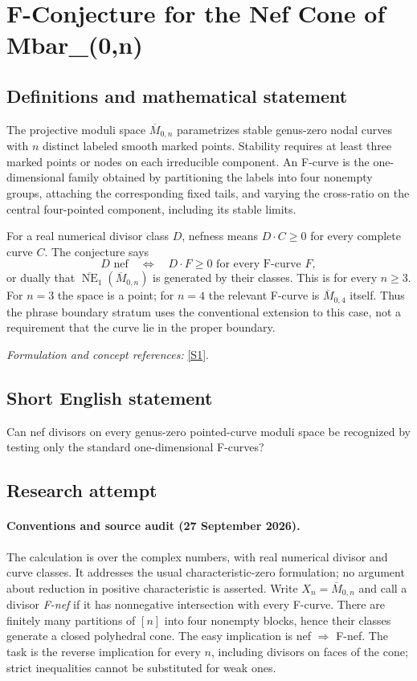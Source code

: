 \documentclass[11pt]{article}
\begin{document}
\section*{\texorpdfstring{F-Conjecture for the Nef Cone of Mbar\_(0,n)}{F-Conjecture for the Nef Cone of Mbar\_(0,n)}}\label{30006972}
\subsection{Definitions and mathematical statement}
The projective moduli space $\overline M_{0,n}$ parametrizes stable genus-zero nodal curves with $n$ distinct labeled smooth marked points. Stability requires at least three marked points or nodes on each irreducible component. An F-curve is the one-dimensional family obtained by partitioning the labels into four nonempty groups, attaching the corresponding fixed tails, and varying the cross-ratio on the central four-pointed component, including its stable limits.

For a real numerical divisor class $D$, nefness means $D\cdot C\ge0$ for every complete curve $C$. The conjecture says
\[
 D\text{ nef}\quad\Longleftrightarrow\quad
 D\cdot F\ge0\text{ for every F-curve }F,
\]
or dually that $\overline{\operatorname{NE}}_1(\overline M_{0,n})$ is generated by their classes. This is for every $n\ge3$. For $n=3$ the space is a point; for $n=4$ the relevant F-curve is $\overline M_{0,4}$ itself. Thus the phrase boundary stratum uses the conventional extension to this case, not a requirement that the curve lie in the proper boundary.
\par\smallskip\textit{Formulation and concept references:} \href{https://arxiv.org/html/2507.12434v1}{[S1]}.

\subsection{Short English statement}
Can nef divisors on every genus-zero pointed-curve moduli space be recognized by testing only the standard one-dimensional F-curves?
\subsection{Research attempt}

\paragraph{Conventions and source audit (27 September 2026).}
The calculation is over the complex numbers, with real numerical divisor
and curve classes. It addresses the usual characteristic-zero formulation;
no argument about reduction in positive characteristic is asserted. Write
$X_n=\overline M_{0,n}$ and call a divisor \emph{F-nef} if it has nonnegative
intersection with every F-curve. There are finitely many partitions of
$[n]$ into four nonempty blocks, hence their classes generate a closed
polyhedral cone. The easy implication is nef $\Rightarrow$ F-nef. The task
is the reverse implication for every $n$, including divisors on faces of
the cone; strict inequalities cannot be substituted for weak ones.
\end{document}
